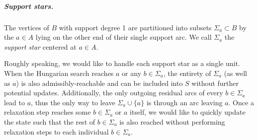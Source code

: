 \documentclass[a4paper,UKenglish]{socg-lipics-v2018}
\theoremstyle{plain}
\numberwithin{figure}{section}
\renewcommand{\paragraph}{\subparagraph}
\def\EMPH#1{\textcolor{BrickRed}{{\emph{#1}}}}
\begin{document}
\paragraph{Support stars.}
The vertices of $B$ with support degree 1 are partitioned into subsets
$\Sigma_a \subset B$ by the $a \in A$ lying on the other end of their single
support arc.
We call \EMPH{$\Sigma_a$} the \EMPH{support star} centered at $a \in A$.

Roughly speaking, we would like to handle each support star as a single unit.
When the Hungarian search reaches $a$ or any $b \in \Sigma_a$, the
entirety of $\Sigma_a$ (as well as $a$) is also admissibly-reachable and can be
included into $S$ without further potential updates.
Additionally, the only outgoing residual arcs of every $b \in \Sigma_a$ lead to
$a$, thus the only way to leave $\Sigma_a \cup \{a\}$ is through an arc leaving $a$.
Once a relaxation step reaches some $b \in \Sigma_a$ or $a$ itself, we would
like to quickly update the state such that the rest of $b \in \Sigma_a$ is also
reached without performing relaxation steps to each individual
$b \in \Sigma_a$.
\end{document}

